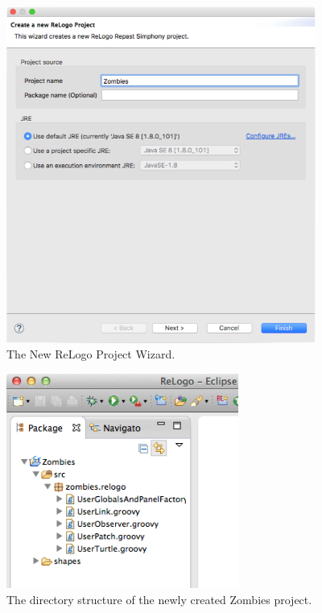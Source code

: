 \documentclass[11pt]{amsart}
\begin{document}
\begin{figure}[h]
\begin{center}
\vspace{.2in}
\centerline {
\includegraphics[width=4in]{GettingStartedImages/NewProject2.png}
}
\caption{The New ReLogo Project Wizard.}
\label{fig:newprojectwiz}
\end{center}
\end{figure}

\begin{figure}[h]
\begin{center}
\vspace{.2in}
\centerline {
\includegraphics[width=3in]{GettingStartedImages/ZombiesDirectoryStructure.png}
}
\caption{The directory structure of the newly created Zombies project.}
\label{fig:projectstructure}
\end{center}
\end{figure}
\end{document}
